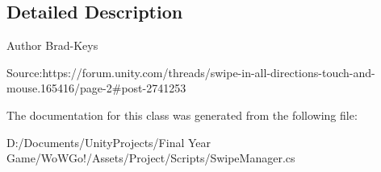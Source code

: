 \subsection{Detailed Description}
\begin{DoxyAuthor}{Author}
Brad-\/\+Keys 

Source\+:https\+://forum.unity.\+com/threads/swipe-\/in-\/all-\/directions-\/touch-\/and-\/mouse.165416/page-\/2\#post-\/2741253 
\end{DoxyAuthor}


The documentation for this class was generated from the following file\+:\begin{DoxyCompactItemize}
\item 
D\+:/\+Documents/\+Unity\+Projects/\+Final Year Game/\+Wo\+W\+Go!/\+Assets/\+Project/\+Scripts/Swipe\+Manager.\+cs\end{DoxyCompactItemize}
